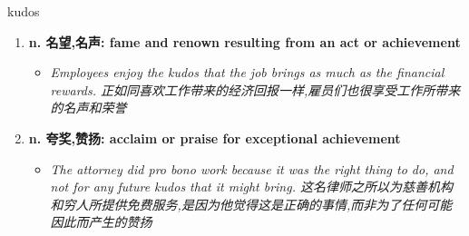
\begin{frame}
{\huge kudos}
\begin{center}
\begin{enumerate}\Large
  \item \textbf{n. 名望,名声: fame and renown resulting from an act or achievement}
  \begin{itemize}
    \item \em{\Large{Employees enjoy the kudos that the job brings as much as the financial rewards. 正如同喜欢工作带来的经济回报一样,雇员们也很享受工作所带来的名声和荣誉}}
  \end{itemize}
  \item \textbf{n. 夸奖,赞扬: acclaim or praise for exceptional achievement}
  \begin{itemize}
    \item \em{\Large{The attorney did pro bono work because it was the right thing to do, and not for any future kudos that it might bring. 这名律师之所以为慈善机构和穷人所提供免费服务,是因为他觉得这是正确的事情,而非为了任何可能因此而产生的赞扬}}
  \end{itemize}
\end{enumerate}
\end{center}
\end{frame}
